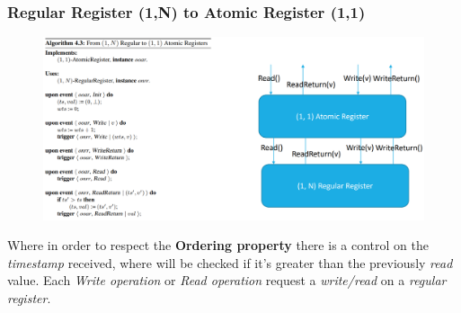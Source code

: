 \documentclass{article}
\begin{document}
\subsubsection{Regular Register (1,N) to Atomic Register (1,1)}
\begin{figure}[H]
  \centering
  \includegraphics[scale=0.65,left]{cattura71.png}
\end{figure}
Where in order to respect the \textbf{Ordering property} there is a control on the \emph{timestamp} received, where will be checked if it's greater than the previously \emph{read} value. Each \emph{Write operation} or \emph{Read operation} request a \emph{write/read }on a \emph{regular register}.
\end{document}
